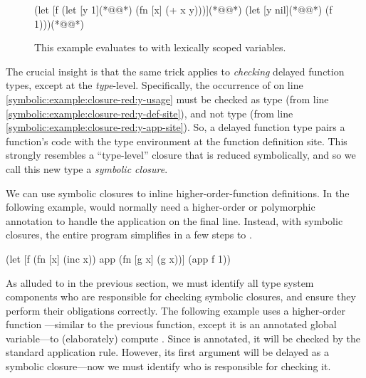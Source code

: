 \begin{figure}
{
\lstset{numbers=left}
\begin{cljlisting}
(let [f (let [y 1](*@\label{symbolic:example:closure-red:y-def-site}@*)
          (fn [x] (+ x y)))](*@\label{symbolic:example:closure-red:y-usage}@*)
  (let [y nil](*@\label{symbolic:example:closure-red:y-app-site}@*)
    (f 1)))(*@\label{symbolic:example:closure-red:f-app}@*)
\end{cljlisting}
}
  \caption{This example evaluates to  with lexically scoped variables.}
  \label{symbolic:example:closure-red}
\end{figure}

The crucial insight is that
the same trick applies to \emph{checking} delayed function types,
except at the \emph{type}-level.
Specifically, the occurrence of 
on line \ref{symbolic:example:closure-red:y-usage}
must be checked as type  (from line \ref{symbolic:example:closure-red:y-def-site}),
and not type  (from line \ref{symbolic:example:closure-red:y-app-site}).
So, a delayed function type pairs a function's code with the type environment
at the function definition site.
This strongly resembles a ``type-level'' closure that is reduced symbolically,
and so we call this new type a \emph{symbolic closure}.

We can use symbolic closures to inline higher-order-function definitions.
In the following example,  would normally need a higher-order
or polymorphic
annotation to handle the application on the final line.
Instead, with symbolic closures, the entire program simplifies in a few steps to
.

\begin{cljlisting}
(let [f (fn [x] (inc x))
      app (fn [g x] (g x))]
  (app f 1))
\end{cljlisting}

As alluded to in the previous section, we must identify
all type system components who are responsible for checking symbolic closures,
and ensure they perform their obligations correctly.
The following example uses a higher-order function
---similar to the previous 
function, except it is an annotated global
variable---to (elaborately) compute .
Since  is annotated, it will be checked
by the standard application rule.
However, its first argument will be delayed as a symbolic
closure---now we must identify who is responsible for checking it.

